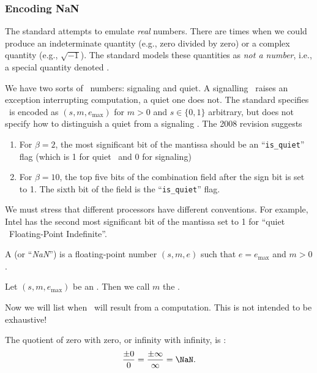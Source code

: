 \subsubsection{Encoding NaN}

The  standard attempts to emulate \emph{real} numbers. There
are times when we could produce an indeterminate quantity (e.g., zero divided
by zero) or a complex quantity (e.g., $\sqrt{-1}$). The standard models
these quantities as \emph{not a number}, i.e., a special quantity
denoted \NaN.

We have two sorts of \NaN\ numbers: signaling and quiet. A signalling
\NaN\ raises an exception interrupting computation, a quiet one does
not. The  standard specifies \NaN\ is encoded as $(s,m,e_{\text{max}})$
for $m>0$ and $s\in\{0,1\}$ arbitrary, but does not specify how to
distinguish a quiet from a signaling \NaN. The 2008 revision suggests
\begin{enumerate}
\item For $\beta=2$, the most significant bit of the mantissa should be an
  ``\verb|is_quiet|'' flag (which is 1 for quiet \NaN\ and 0 for signaling)
\item For $\beta=10$, the top five bits of the combination field after
  the sign bit is set to 1. The sixth bit of the field is the ``\verb|is_quiet|''
  flag.
\end{enumerate}
We must stress that different processors have different conventions. For
example, Intel has the second most significant bit of the mantissa set
to 1 for ``quiet \NaN\ Floating-Point Indefinite''.

\begin{defn}
  A  (or ``\emph{NaN}'') is a floating-point number
  $(s,m,e)$ such that $e=e_{\text{max}}$ and $m>0$.
\end{defn}

\begin{defn}
  Let $(s,m,e_{\text{max}})$ be an \NaN. Then we call $m$ the .
\end{defn}

Now we will list when \NaN\ will result from a computation. This is not
intended to be exhaustive!

\begin{axiom}
  The quotient of zero with zero, or infinity with infinity, is \NaN:
  \begin{equation}
    \frac{\pm0}{0} = \frac{\pm \infty}{\infty} = \NaN.
  \end{equation}
\end{axiom}

